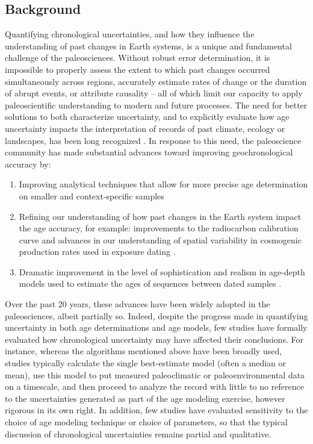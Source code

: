 \documentclass[gchron, manuscript]{copernicus}
\begin{document}
\introduction

\subsection{Background}

Quantifying chronological uncertainties, and how they influence the understanding of past changes in Earth systems, is a unique and fundamental challenge of the paleosciences.
Without robust error determination, it is impossible to properly assess the extent to which past changes occurred simultaneously across regions, accurately estimate rates of change or the duration of abrupt events, or attribute causality -- all of which limit our capacity to apply paleoscientific understanding to modern and future processes.
The need for better solutions to both characterize uncertainty, and to explicitly evaluate how age uncertainty impacts the interpretation of records of past climate, ecology or landscapes, has been long recognized \citep[e.g.,][]{Noren2013, NASEM_CORES_2020}.
In response to this need, the paleoscience community has made substantial advances toward improving geochronological accuracy by:

\begin{enumerate}
\def\labelenumi{\arabic{enumi}.}
\item
  Improving analytical techniques that allow for more precise age determination on smaller and context-specific samples \citep[e.g.,][]{Eggins2005, Santos_blank_2010, zander2020miniature}
\item
  Refining our understanding of how past changes in the Earth system impact the age accuracy, for example: improvements to the radiocarbon calibration curve \citep{intcal13, intcal20} and advances in our understanding of spatial variability in cosmogenic production rates used in exposure dating \citep{Balco2009, Masarik2009, charreau2019basinga}.
\item
  Dramatic improvement in the level of sophistication and realism in age-depth models used to estimate the ages of sequences between dated samples \citep[e.g.][]{parnell2008flexible, Ramsey2009Bayesian, Blaauw2010CLAM, Blaauw2011BACON}.
\end{enumerate}

Over the past 20 years, these advances have been widely adopted in the paleosciences, albeit partially so.
Indeed, despite the progress made in quantifying uncertainty in both age determinations and age models, few studies have formally evaluated how chronological uncertainty may have affected their conclusions.
For instance, whereas the algorithms mentioned above have been broadly used, studies typically calculate the single best-estimate model (often a median or mean), use this model to put measured paleoclimatic or paleoenvironmental data on a timescale, and then proceed to analyze the record with little to no reference to the uncertainties generated as part of the age modeling exercise, however rigorous in its own right.
In addition, few studies have evaluated sensitivity to the choice of age modeling technique or choice of parameters, so that the typical discussion of chronological uncertainties remains partial and qualitative.
\end{document}
